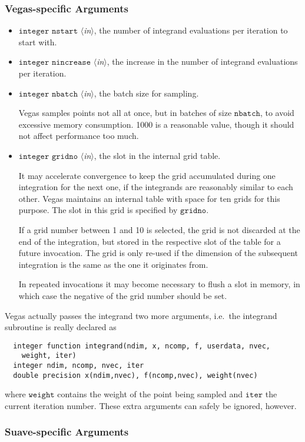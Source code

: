 \documentclass[12pt]{article}
\newcommand\ie{i.e.\ }
\newcommand\Code[1]{\ensuremath{\texttt{#1}}}
\newcommand\VarIn[1]{\item\Code{#1} \textit{$\langle$in\/$\rangle$},}
\begin{document}
\subsubsection{Vegas-specific Arguments}
\label{sect:vegasargs}

\begin{itemize}
\VarIn{integer nstart}
the number of integrand evaluations per iteration to start with.

\VarIn{integer nincrease}
the increase in the number of integrand evaluations per iteration.

\VarIn{integer nbatch}
the batch size for sampling.

Vegas samples points not all at once, but in batches of size
\Code{nbatch}, to avoid excessive memory consumption.  1000 is a
reasonable value, though it should not affect performance too much.

\VarIn{integer gridno}
the slot in the internal grid table.

It may accelerate convergence to keep the grid accumulated during one
integration for the next one, if the integrands are reasonably similar 
to each other.  Vegas maintains an internal table with space for ten
grids for this purpose.  The slot in this grid is specified by
\Code{gridno}.

If a grid number between 1 and 10 is selected, the grid is not discarded
at the end of the integration, but stored in the respective slot of the 
table for a future invocation.  The grid is only re-used if the 
dimension of the subsequent integration is the same as the one it 
originates from.

In repeated invocations it may become necessary to flush a slot in
memory, in which case the negative of the grid number should be set.
\end{itemize}

Vegas actually passes the integrand two more arguments, \ie the 
integrand subroutine is really declared as
\begin{verbatim}
  integer function integrand(ndim, x, ncomp, f, userdata, nvec,
    weight, iter)
  integer ndim, ncomp, nvec, iter
  double precision x(ndim,nvec), f(ncomp,nvec), weight(nvec)
\end{verbatim}
where \Code{weight} contains the weight of the point being sampled and
\Code{iter} the current iteration number.  These extra arguments can
safely be ignored, however.


\subsubsection{Suave-specific Arguments}
\end{document}
